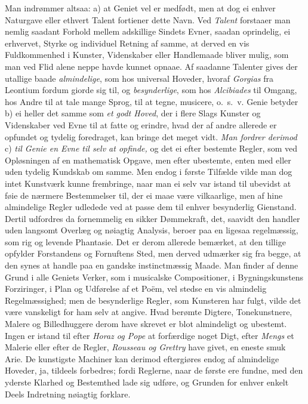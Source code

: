 \documentclass[12pt,a4paper]{article}
\newcommand{\opage}[1]{\marginnote{\footnotesize\textit{[#1]}}}
\begin{document}
\opage{172} Man indrømmer altsaa: a) at Geniet vel er medfødt, men at dog ei enhver Naturgave eller
ethvert Talent fortiener dette Navn. Ved \emph{Talent} forstaaer man nemlig saadant
Forhold mellem adskillige Sindets Evner, saadan oprindelig, ei erhvervet, Styrke og
individuel Retning af samme, at derved en vis Fuldkommenhed i Kunster, Videnskaber eller
Handlemaade bliver mulig, som man ved Flid alene neppe havde kunnet opnaae. Af saadanne
Talenter gives der utallige baade \emph{almindelige}, som hos universal Hoveder, hvoraf
\emph{Gorgias} fra Leontium fordum giorde sig til, og \emph{besynderlige}, som hos
\emph{Alcibiades} til Omgang, hos Andre til at tale mange Sprog, til at tegne, musicere,
o.~s.~v. Genie betyder b) ei heller det samme som \emph{et godt Hoved}, der i flere Slags
Kunster og Videnskaber ved Evne til at fatte og erindre, hvad der af andre allerede er
opfundet og tydelig foredraget, kan bringe det meget vidt. \emph{Man fordrer derimod}
c) \emph{til Genie en Evne til selv at opfinde,} og det ei efter bestemte Regler, som ved
Opløsningen af en mathematisk Opgave, men efter ubestemte, enten med eller uden tydelig
Kundskab om samme. Men endog i første Tilfælde vilde man dog intet Kunstværk kunne
frembringe, naar man ei selv var istand til ubevidst at føie de nærmere Bestemmelser til,
der ei maae være vilkaarlige, men af hine almindelige Regler udledede ved at passe dem til
enhver besynderlig Gienstand. Dertil
\opage{173} udfordres da fornemmelig en sikker Dømmekraft, det, saavidt den handler uden langsomt
Overlæg og nøiagtig Analysis, beroer paa en ligesaa regelmæssig, som rig og levende
Phantasie. Det er derom allerede bemærket, at den tillige opfylder Forstandens og
Fornuftens Sted, men derved udmærker sig fra begge, at den synes at handle paa en gandske
instinctmæssig Maade. Man finder af denne Grund i alle Geniets Verker, som i musicalske
Compositioner, i Bygningskunstens Forziringer, i Plan og Udførelse af et Poëm, vel stedse
en vis almindelig Regelmæssighed; men de besynderlige Regler, som Kunsteren har fulgt,
vilde det være vanskeligt for ham selv at angive. Hvad berømte Digtere, Tonekunstnere,
Malere og Billedhuggere derom have skrevet er blot almindeligt og ubestemt. Ingen er
istand til efter \emph{Horaz og Pope} at forfærdige noget Digt, efter \emph{Mengs} et
Malerie eller efter de Regler, \emph{Rousseau og Grettry} have givet, en eneste smuk Arie.
De kunstigste Machiner kan derimod eftergiøres endog af almindelige Hoveder, ja, tildeels
forbedres; fordi Reglerne, naar de første ere fundne, med den yderste Klarhed og
Bestemthed lade sig udføre, og Grunden for enhver enkelt Deels Indretning nøiagtig
forklare.
\end{document}
